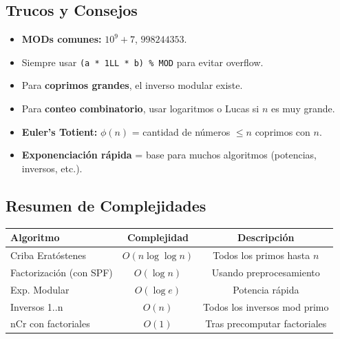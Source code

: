 \documentclass{article}
\begin{document}
\subsection{Trucos y Consejos}

\begin{itemize}
  \item \textbf{MODs comunes:} \(10^9+7\), \(998244353\).
  \item Siempre usar \lstinline|(a * 1LL * b) % MOD| para evitar overflow.
  \item Para \textbf{coprimos grandes}, el inverso modular existe.
  \item Para \textbf{conteo combinatorio}, usar logaritmos o Lucas si \(n\) es muy grande.
  \item \textbf{Euler’s Totient:} \(\phi(n)\) = cantidad de números \(\le n\) coprimos con \(n\).
  \item \textbf{Exponenciación rápida} = base para muchos algoritmos (potencias, inversos, etc.).
\end{itemize}


\subsection{Resumen de Complejidades}

\begin{center}
\begin{tabular}{lcc}
\hline
Algoritmo & Complejidad & Descripción \\
\hline
Criba Eratóstenes & \(O(n \log\log n)\) & Todos los primos hasta \(n\) \\
Factorización (con SPF) & \(O(\log n)\) & Usando preprocesamiento \\
Exp. Modular & \(O(\log e)\) & Potencia rápida \\
Inversos 1..n & \(O(n)\) & Todos los inversos mod primo \\
nCr con factoriales & \(O(1)\) & Tras precomputar factoriales \\
\hline
\end{tabular}
\end{center}
\end{document}
